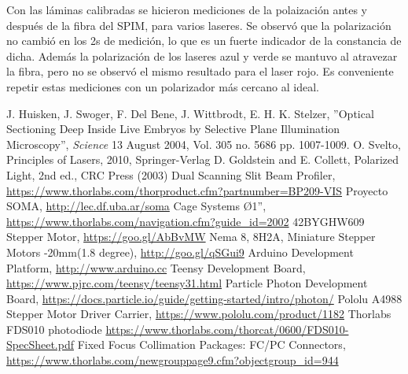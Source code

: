 \documentclass[12pt,a4paper]{article}
\begin{document}
        Con las láminas calibradas se hicieron mediciones de la polaización antes y después de la fibra del SPIM, para varios laseres. Se observó que la polarización no cambió en los 2s de medición, lo que es un fuerte indicador de la constancia de dicha. Además la polarización de los laseres azul y verde se mantuvo al atravezar la fibra, pero no se observó el mismo resultado para el laser rojo. Es conveniente repetir estas mediciones con un polarizador más cercano al ideal.

    \begin{thebibliography}{3}
        J. Huisken, J. Swoger, F. Del Bene, J. Wittbrodt, E. H. K. Stelzer, ''Optical Sectioning Deep Inside Live Embryos by Selective Plane Illumination Microscopy'', \emph{Science} 13 August 2004, Vol. 305 no. 5686 pp. 1007-1009.
            O. Svelto, Principles of Lasers, 2010, Springer-Verlag
            D. Goldstein and E. Collett, Polarized Light, 2nd ed., CRC Press (2003)
            Dual Scanning Slit Beam Profiler, {\footnotesize \url{https://www.thorlabs.com/thorproduct.cfm?partnumber=BP209-VIS}}
            Proyecto SOMA, \url{http://lec.df.uba.ar/soma}
            Cage Systems Ø1'', \url{https://www.thorlabs.com/navigation.cfm?guide_id=2002}
            42BYGHW609 Stepper Motor, \url{https://goo.gl/AbBvMW}
            Nema 8, 8H2A, Miniature Stepper Motors -20mm(1.8 degree), \url{http://goo.gl/qSGui9}
            Arduino Development Platform, \url{http://www.arduino.cc}
            Teensy Development Board,  \url{https://www.pjrc.com/teensy/teensy31.html}
            Particle Photon Development Board, \url{https://docs.particle.io/guide/getting-started/intro/photon/}
            Pololu A4988 Stepper Motor Driver Carrier,  \url{https://www.pololu.com/product/1182}
         Thorlabs FDS010 photodiode \url{https://www.thorlabs.com/thorcat/0600/FDS010-SpecSheet.pdf}
            Fixed Focus Collimation Packages: FC/PC Connectors, \\ \url{https://www.thorlabs.com/newgrouppage9.cfm?objectgroup_id=944}
    \end{thebibliography}
\end{document}
